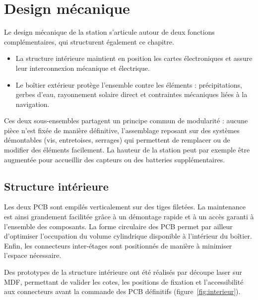 \section{Design mécanique}\label{sec:mecanique}

Le design mécanique de la station s'articule autour de deux fonctions complémentaires, qui structurent également ce chapitre. 
\begin{itemize}
    \item La structure intérieure maintient en position les cartes électroniques et assure leur interconnexion mécanique et électrique.
    \item Le boîtier extérieur protège l'ensemble contre les éléments : précipitations, gerbes d'eau, rayonnement solaire direct et contraintes mécaniques liées à la navigation. 
\end{itemize}
 Ces deux sous-ensembles partagent un principe commun de modularité : aucune pièce n'est fixée de manière définitive, l'assemblage reposant sur des systèmes démontables (vis, entretoises, serrages) qui permettent de remplacer ou de modifier des éléments facilement. La hauteur de la station peut par exemple être augmentée pour accueillir des capteurs ou des batteries supplémentaires.

\subsection{Structure intérieure}\label{subsec:interieur}
Les deux PCB sont empilés verticalement sur des tiges filetées. La maintenance est ainsi grandement facilitée grâce à un démontage rapide et à un accès garanti à l’ensemble des composants. La forme circulaire des PCB permet par ailleur d’optimiser l’occupation du volume cylindrique disponible à l’intérieur du boîtier. Enfin, les connecteurs inter-étages sont positionnés de manière à minimiser l’espace nécessaire.


Des prototypes de la structure intérieure ont été réalisés par découpe laser sur MDF, permettant de valider les cotes, les positions de fixation et l'accessibilité aux connecteurs avant la commande des PCB définitifs (figure~\ref{fig:interieur}).

